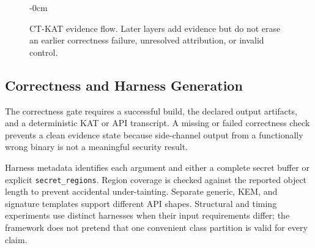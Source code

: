 \documentclass[cryptography,article,submit,moreauthors]{Definitions/mdpi}
\newcommand{\evidence}[1]{\texttt{#1}}
\begin{document}
\begin{figure}[H]
\begin{adjustwidth}{-\extralength}{0cm}
\centering
{}
\end{adjustwidth}
\caption{CT-KAT evidence flow. Later layers add evidence but do not erase an
earlier correctness failure, unresolved attribution, or invalid control.
\label{fig:pipeline}}
\end{figure}

\subsection{Correctness and Harness Generation}

The correctness gate requires a successful build, the declared output
artifacts, and a deterministic KAT or API transcript. A missing or failed
correctness check prevents a clean evidence state because side-channel output
from a functionally wrong binary is not a meaningful security result.

Harness metadata identifies each argument and either a complete secret buffer
or explicit \texttt{secret\_regions}. Region coverage is checked against the
reported object length to prevent accidental under-tainting. Separate generic,
KEM, and signature templates support different API shapes. Structural and
timing experiments use distinct harnesses when their input requirements differ;
the framework does not pretend that one convenient class partition is valid
for every claim.
\end{document}
